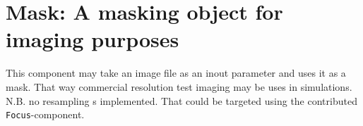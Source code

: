 \section{Mask: A masking object for imaging purposes}


This component may take an image file as an inout parameter and uses it as a mask. That way commercial resolution test imaging may be uses in simulations. 
N.B. no resampling s implemented. That could be targeted using the contributed \texttt{Focus}-component.
